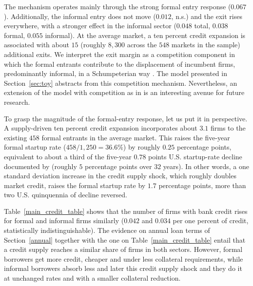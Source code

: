 \documentclass[12pt]{article}
\begin{document}
\begin{table}[H]
    \caption{Shift-Share IV estimates of the effect of bank shocks on the number of firms}
    \label{main_table}
    \centering
    \small
    
\end{table}

The mechanism operates mainly through the strong formal entry response ($0.067$). Additionally, the informal entry does not move ($0.012$, n.s.) and the exit rises everywhere, with a stronger effect in the informal sector ($0.048$ total, $0.038$ formal, $0.055$ informal). At the average market, a ten percent credit expansion is associated with about $15$ (roughly $8{,}300$ across the $548$ markets in the sample) additional exits. We interpret the exit margin as a competition component in which the formal entrants contribute to the displacement of incumbent firms, predominantly informal, in a Schumpeterian way \citep{schumpeter1942creative}. The model presented in Section~\ref{sec:toy} abstracts from this competition mechanism. Nevertheless, an extension of the model with competition as in \citet{melitz2003impact} is an interesting avenue for future research.

To grasp the magnitude of the formal-entry response, let us put it in perspective. A supply-driven ten percent credit expansion incorporates about $3.1$ firms to the existing $458$ formal entrants in the average market. This raises the five-year formal startup rate ($458/1{,}250 = 36.6\%$) by roughly $0.25$ percentage points, equivalent to about a third of the five-year $0.78$ points U.S. startup-rate decline documented by \citet{pugsley2019grown} (roughly $5$ percentage points over $32$ years). In other words, a one standard deviation increase in the credit supply shock, which roughly doubles market credit, raises the formal startup rate by $1.7$ percentage points, more than two U.S. quinquennia of decline reversed.

Table~\ref{main_credit_table} shows that the number of firms with bank credit rises for formal and informal firms similarly ($0.042$ and $0.034$ per one percent of credit, statistically indistinguishable). The evidence on annual loan terms of Section~\ref{annual} together with the one on Table~\ref{main_credit_table} entail that a credit supply reaches a similar share of firms in both sectors. However, formal borrowers get more credit, cheaper and under less collateral requirements, while informal borrowers absorb less and later this credit supply shock and they do it at unchanged rates and with a smaller collateral reduction.
\end{document}
